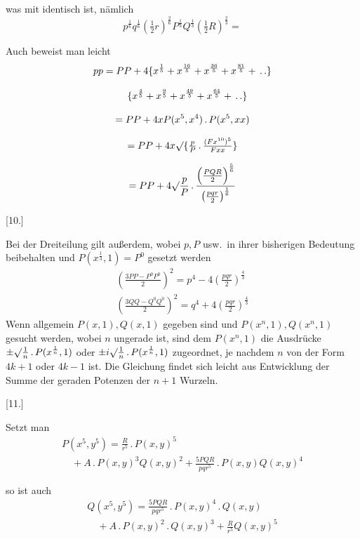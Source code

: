 was mit \GaussCircleArrow{} identisch ist, nämlich
\[
p^{\frac16}q^{\frac16}(\tfrac12r)^{\frac26}
P^{\frac{1}{3}}
Q^{\frac{1}{3}}
(\tfrac12R)^{\frac23}=
\]

Auch beweist man leicht
\[
\begin{gathered}
pp=PP+4\{x^{\frac15}+x^{\frac{16}5}+x^{\frac{36}5}+x^{\frac{81}5}+\, .\,.\}
\\[8pt]\quad{}\{x^{\frac45}+x^{\frac95}+x^{\frac{49}5}+x^{\frac{64}5}+\, .\,.\}\\[8pt]
=PP+4xP(x^5,x^4)\, .\,P(x^5,xx)\\[8pt]
=PP+4x\surd\{\tfrac pP\, .\,\tfrac{(Fx^{10})^5}{Fxx}\}\\[8pt]
=PP+4\surd\frac pP\, .\,\frac{\left(\frac{PQR}{2}\right)^{\frac56}}{\left(\frac{pqr}{2}\right)^{\frac16}}
\end{gathered}
\]

\par\medskip{}\centerline{[10.]}\nobreak\smallskip
Bei der Dreiteilung gilt außerdem, wobei \(p,P\) usw.\ in ihrer bisherigen Bedeutung beibehalten
und \(P(x^{\frac13},1)=P^0\) gesetzt werden
\[
\begin{gathered}
\left(\frac{3PP-P^0P^0}{2}\right)^2=p^4-4\left(\frac{pqr}{2}\right)^{\frac43}\\[8pt]
\left(\frac{3QQ-Q^0Q^0}{2}\right)^2=q^4+4\left(\frac{pqr}{2}\right)^{\frac43}
\end{gathered}
\]
Wenn allgemein \(P(x,1),Q(x,1)\) gegeben sind und \(P(x^n,1),Q(x^n,1)\) gesucht werden,
wobei \(n\) ungerade ist, sind dem \(P(x^n,1)\) die Ausdrücke
\(\pm\surd\frac1n\, .\,P(x^{\frac1n},1)\)
oder \(\pm i\surd\frac1n\, .\,P(x^{\frac1n},1)\) zugeordnet, je nachdem \(n\) von der Form
\(4k+1\) oder \(4k-1\) ist.
Die Gleichung findet sich leicht aus Entwicklung der Summe der geraden Potenzen
der \(n+1\) Wurzeln.

\par\medskip{}\centerline{[11.]}\nobreak\smallskip
Setzt man
\[
\begin{gathered}P(x^5,y^5)=\frac{R}{r^5}\, .\,P(x,y)^5
\\[8pt]\quad{}+A\, .\,P(x,y)^3Q(x,y)^2
+\frac{5PQR}{pqr^5}\, .\,P(x,y)Q(x,y)^4\end{gathered}
\]

so ist auch
\[
\begin{gathered}
Q(x^5,y^5)
=\frac{5PQR}{pqr^5}\, .\,P(x,y)^4\, .\,Q(x,y)\\[8pt]
\quad+A\, .\,P(x,y)^2\, .\,Q(x,y)^3
+\frac{R}{r^5}Q(x,y)^5
\end{gathered}
\]

